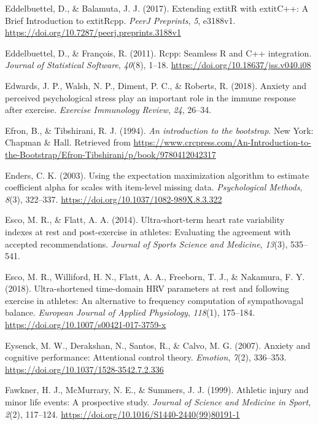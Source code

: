 \documentclass[
  english,
  man,floatsintext]{apa6}
\begin{document}
\leavevmode\hypertarget{ref-R-Rcpp_b}{}%
Eddelbuettel, D., \& Balamuta, J. J. (2017). Extending extitR with extitC++: A Brief Introduction to extitRcpp. \emph{PeerJ Preprints}, \emph{5}, e3188v1. \url{https://doi.org/10.7287/peerj.preprints.3188v1}

\leavevmode\hypertarget{ref-R-Rcpp_a}{}%
Eddelbuettel, D., \& François, R. (2011). Rcpp: Seamless R and C++ integration. \emph{Journal of Statistical Software}, \emph{40}(8), 1--18. \url{https://doi.org/10.18637/jss.v040.i08}

\leavevmode\hypertarget{ref-Edwards2018}{}%
Edwards, J. P., Walsh, N. P., Diment, P. C., \& Roberts, R. (2018). Anxiety and perceived psychological stress play an important role in the immune response after exercise. \emph{Exercise Immunology Review}, \emph{24}, 26--34.

\leavevmode\hypertarget{ref-Efron1993}{}%
Efron, B., \& Tibshirani, R. J. (1994). \emph{An introduction to the bootstrap}. New York: Chapman \& Hall. Retrieved from \url{https://www.crcpress.com/An-Introduction-to-the-Bootstrap/Efron-Tibshirani/p/book/9780412042317}

\leavevmode\hypertarget{ref-Enders2003}{}%
Enders, C. K. (2003). Using the expectation maximization algorithm to estimate coefficient alpha for scales with item-level missing data. \emph{Psychological Methods}, \emph{8}(3), 322--337. \url{https://doi.org/10.1037/1082-989X.8.3.322}

\leavevmode\hypertarget{ref-Esco2014}{}%
Esco, M. R., \& Flatt, A. A. (2014). Ultra-short-term heart rate variability indexes at rest and post-exercise in athletes: Evaluating the agreement with accepted recommendations. \emph{Journal of Sports Science and Medicine}, \emph{13}(3), 535--541.

\leavevmode\hypertarget{ref-Esco2018}{}%
Esco, M. R., Williford, H. N., Flatt, A. A., Freeborn, T. J., \& Nakamura, F. Y. (2018). Ultra-shortened time-domain HRV parameters at rest and following exercise in athletes: An alternative to frequency computation of sympathovagal balance. \emph{European Journal of Applied Physiology}, \emph{118}(1), 175--184. \url{https://doi.org/10.1007/s00421-017-3759-x}

\leavevmode\hypertarget{ref-Eysenck2007}{}%
Eysenck, M. W., Derakshan, N., Santos, R., \& Calvo, M. G. (2007). Anxiety and cognitive performance: Attentional control theory. \emph{Emotion}, \emph{7}(2), 336--353. \url{https://doi.org/10.1037/1528-3542.7.2.336}

\leavevmode\hypertarget{ref-Fawkner1999}{}%
Fawkner, H. J., McMurrary, N. E., \& Summers, J. J. (1999). Athletic injury and minor life events: A prospective study. \emph{Journal of Science and Medicine in Sport}, \emph{2}(2), 117--124. \url{https://doi.org/10.1016/S1440-2440(99)80191-1}
\end{document}
